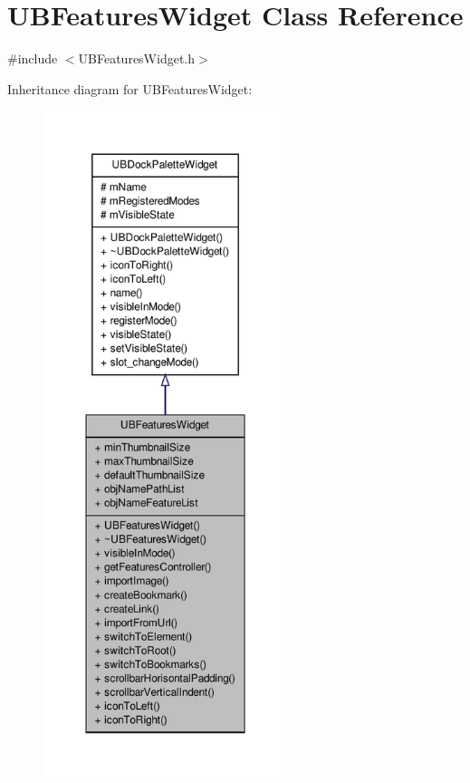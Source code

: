 \hypertarget{class_u_b_features_widget}{\section{U\-B\-Features\-Widget Class Reference}
\label{d5/d85/class_u_b_features_widget}
}


{\ttfamily \#include $<$U\-B\-Features\-Widget.\-h$>$}



Inheritance diagram for U\-B\-Features\-Widget\-:
\nopagebreak
\begin{figure}[H]
\begin{center}
\leavevmode
\includegraphics[height=550pt]{df/d06/class_u_b_features_widget__inherit__graph}
\end{center}
\end{figure}


